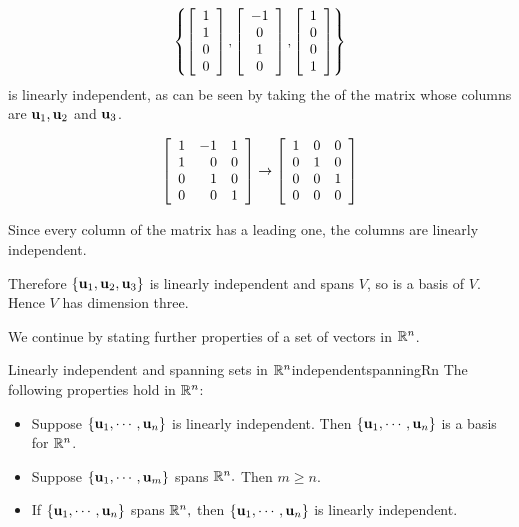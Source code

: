 \begin{solution}
\[\left\{ 
\left[\begin{array}{c} 1\\ 1\\ 0\\ 0\end{array}\right],
\left[\begin{array}{c} -1\\ 0\\ 1\\ 0\end{array}\right],
\left[\begin{array}{c} 1\\ 0\\ 0\\ 1\end{array}\right] \right\}\]
is linearly independent, as can be seen by taking the
{\rref} of the matrix whose columns are
${\bf u}_1, {\bf u}_2$ and ${\bf u}_3$.

\[ \left[\begin{array}{rrr}
1 & -1 & 1 \\
1 & 0 & 0 \\
0 & 1 & 0 \\
0 & 0 & 1 \end{array}\right]
\rightarrow
\left[\begin{array}{rrr}
1 & 0 & 0 \\
0 & 1 & 0 \\
0 & 0 & 1 \\
0 & 0 & 0 \end{array}\right]
\]

Since every column of the {\rref} matrix has a leading one,
the columns are linearly independent.

Therefore $\{ {\bf u}_1, {\bf u}_2, {\bf u}_3 \}$ is linearly
independent and spans $V$, so is a basis of $V$. Hence 
$V$ has dimension three.
\end{solution}

We continue by stating further properties of a set of vectors in  $\mathbb{R}^{n}$.

\begin{corollary}{Linearly independent and spanning sets in  $\mathbb{R}^{n}$}{independentspanningRn}
The following properties hold in $\mathbb{R}^{n}$:
\begin{itemize}
\item Suppose $\left\{ {\bf u}_{1},\cdots ,{\bf u}_{n}\right\} $ is linearly independent. Then $\left\{ {\bf u}_{1},\cdots ,{\bf u}_{n}\right\} $ is a basis for $\mathbb{R}^{n}$. 
\item Suppose $\left\{ {\bf u}_{1},\cdots ,{\bf u}_{m}\right\} $ spans $\mathbb{R}^{n}.$ Then $m\geq n.$
\item If $\left\{ {\bf u}_{1},\cdots ,{\bf u}_{n}\right\} $ spans $\mathbb{R}^{n},$ then $\left\{ {\bf u}_{1},\cdots ,{\bf u}_{n}\right\} $ is
linearly independent.
\end{itemize}
\end{corollary}

